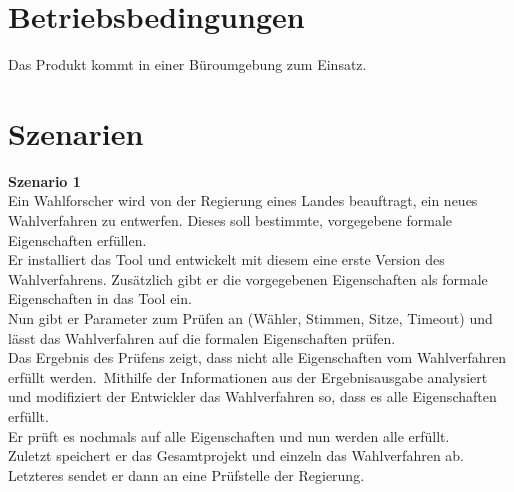 \documentclass[a4paper]{scrreprt}
\begin{document}
\section{Betriebsbedingungen}
Das Produkt kommt in einer Büroumgebung zum Einsatz.


\section{Szenarien}
\textbf{Szenario 1}\\
Ein Wahlforscher wird von der Regierung eines Landes beauftragt, ein neues Wahlverfahren zu entwerfen. Dieses soll bestimmte, vorgegebene formale Eigenschaften erfüllen.\\
Er installiert das Tool und entwickelt mit diesem eine erste Version des Wahlverfahrens. Zusätzlich gibt er die vorgegebenen Eigenschaften als formale Eigenschaften in das Tool ein.\\
Nun gibt er Parameter zum Prüfen an (Wähler, Stimmen, Sitze, Timeout) und lässt das Wahlverfahren auf die formalen Eigenschaften prüfen.\\
Das Ergebnis des Prüfens zeigt, dass nicht alle Eigenschaften vom Wahlverfahren erfüllt werden.\
Mithilfe der Informationen aus der Ergebnisausgabe analysiert und modifiziert der Entwickler das Wahlverfahren so, dass es alle Eigenschaften erfüllt.\\
Er prüft es nochmals auf alle Eigenschaften und nun werden alle erfüllt.\\
Zuletzt speichert er das Gesamtprojekt und einzeln das Wahlverfahren ab. Letzteres sendet er dann an eine Prüfstelle der Regierung.
\end{document}
